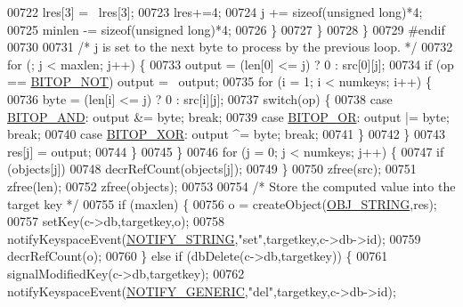 \begin{DoxyCode}
{00722                     lres[3] = ~lres[3];
00723                     lres+=4;
00724                     j += \textcolor{keyword}{sizeof}(\textcolor{keywordtype}{unsigned} \textcolor{keywordtype}{long})*4;
00725                     minlen -= \textcolor{keyword}{sizeof}(\textcolor{keywordtype}{unsigned} \textcolor{keywordtype}{long})*4;
00726                 \}
00727             \}
00728         \}
00729         \textcolor{preprocessor}{#}\textcolor{preprocessor}{endif}
00730 
00731         \textcolor{comment}{/* j is set to the next byte to process by the previous loop. */}
00732         \textcolor{keywordflow}{for} (; j < maxlen; j++) \{
00733             output = (len[0] <= j) ? 0 : src[0][j];
00734             \textcolor{keywordflow}{if} (op == \hyperlink{bitops_8c_a4fa18b2ac29f1722d9db66461bed3288}{BITOP\_NOT}) output = ~output;
00735             \textcolor{keywordflow}{for} (i = 1; i < numkeys; i++) \{
00736                 byte = (len[i] <= j) ? 0 : src[i][j];
00737                 \textcolor{keywordflow}{switch}(op) \{
00738                 \textcolor{keywordflow}{case} \hyperlink{bitops_8c_adb2b31ac9285af6d27408c81c4a1a637}{BITOP\_AND}: output &= byte; \textcolor{keywordflow}{break};
00739                 \textcolor{keywordflow}{case} \hyperlink{bitops_8c_a3877788c36f67d63804710ce8a80d100}{BITOP\_OR}:  output |= byte; \textcolor{keywordflow}{break};
00740                 \textcolor{keywordflow}{case} \hyperlink{bitops_8c_a29fde80dd21281f9ada69d9e65109d14}{BITOP\_XOR}: output ^= byte; \textcolor{keywordflow}{break};
00741                 \}
00742             \}
00743             res[j] = output;
00744         \}
00745     \}
00746     \textcolor{keywordflow}{for} (j = 0; j < numkeys; j++) \{
00747         \textcolor{keywordflow}{if} (objects[j])
00748             decrRefCount(objects[j]);
00749     \}
00750     zfree(src);
00751     zfree(len);
00752     zfree(objects);
00753 
00754     \textcolor{comment}{/* Store the computed value into the target key */}
00755     \textcolor{keywordflow}{if} (maxlen) \{
00756         o = createObject(\hyperlink{server_8h_a65236ea160f69cdef33ec942092af88f}{OBJ\_STRING},res);
00757         setKey(c->db,targetkey,o);
00758         notifyKeyspaceEvent(\hyperlink{server_8h_a1902292b73b71baa65d86db2d61b47ce}{NOTIFY\_STRING},\textcolor{stringliteral}{"set"},targetkey,c->db->id);
00759         decrRefCount(o);
00760     \} \textcolor{keywordflow}{else} \textcolor{keywordflow}{if} (dbDelete(c->db,targetkey)) \{
00761         signalModifiedKey(c->db,targetkey);
00762         notifyKeyspaceEvent(\hyperlink{server_8h_a9fa53dd1068e62365f3964ad3479eec2}{NOTIFY\_GENERIC},\textcolor{stringliteral}{"del"},targetkey,c->db->id);
}
\end{DoxyCode}
